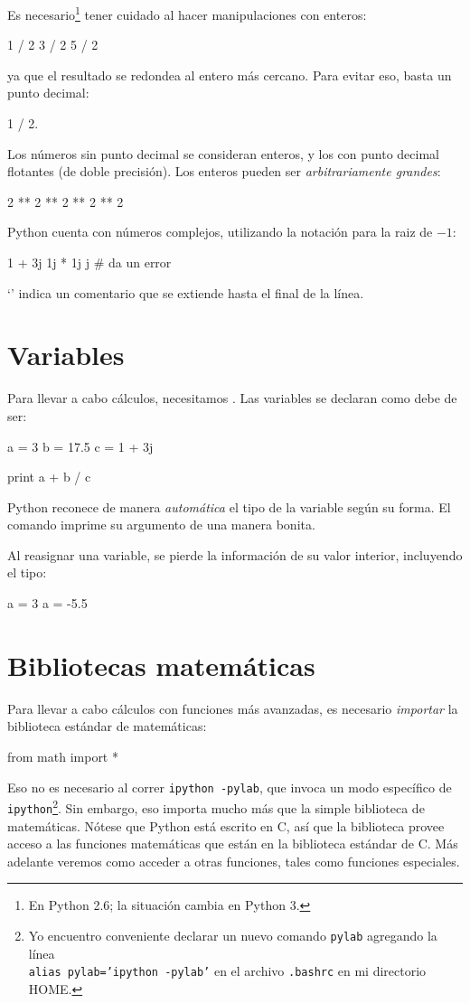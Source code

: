 Es necesario\footnote{En Python 2.6; la situación cambia en Python 3.} tener cuidado al hacer manipulaciones con enteros:
\begin{python}
1 / 2
3 / 2
5 / 2
\end{python}
ya que el resultado se redondea al entero más cercano. Para evitar eso, basta un punto decimal:
\begin{python}
1 / 2.
\end{python}


Los números sin punto decimal se consideran enteros, y los con punto decimal flotantes (de doble precisión).
Los enteros pueden ser \emph{arbitrariamente grandes}:
\begin{python}
2 ** 2 ** 2 ** 2 ** 2
\end{python}



Python cuenta con números complejos, utilizando la notación  para la raiz de $-1$:
\begin{python}
1 + 3j
1j * 1j
j    # da un error
\end{python}
`\inl{#}' indica un comentario que se extiende hasta el final de la línea.



\section{Variables}
Para llevar a cabo cálculos, necesitamos . Las variables se declaran como debe de ser:
\begin{python}
a = 3
b = 17.5
c = 1 + 3j

print a + b / c
\end{python}
Python reconece de manera \emph{automática} el tipo de la variable según su forma.
El comando  imprime su argumento de una manera bonita.

Al reasignar una variable, se pierde la información de su valor interior, incluyendo el tipo:
\begin{python}
a = 3
a = -5.5
\end{python}


\section{Bibliotecas matemáticas}
Para llevar a cabo cálculos con funciones más avanzadas, es necesario \emph{importar} la biblioteca estándar de matemáticas:
\begin{python}
from math import *
\end{python}
Eso no es necesario al correr \texttt{ipython -pylab}, que invoca un modo específico de \texttt{ipython}\footnote{Yo encuentro conveniente declarar un nuevo comando \texttt{pylab} agregando la línea \\ \texttt{alias pylab='ipython -pylab'} en el archivo \texttt{.bashrc} en mi directorio HOME.}.
Sin embargo, eso importa mucho más que la simple biblioteca de matemáticas.  Nótese que Python está escrito en C, así que la biblioteca  provee acceso a las funciones matemáticas que están en la biblioteca estándar de C. Más adelante veremos como acceder a otras funciones, tales como funciones especiales.

